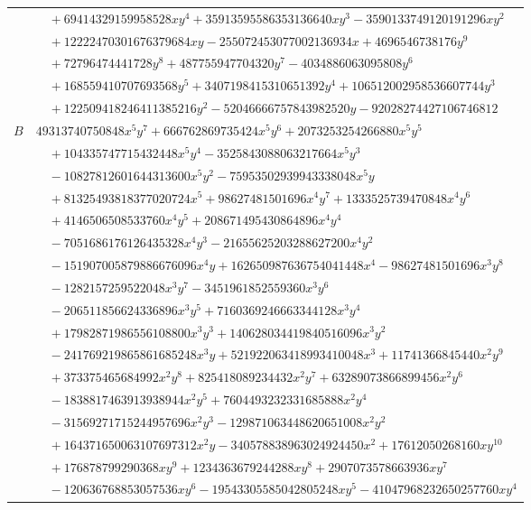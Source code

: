 \documentclass[11pt]{article}
\begin{document}
\begin{longtable}{@{}ll@{}}
 & $\quad +69414329159958528xy^{4}+35913595586353136640xy^{3}-3590133749120191296xy^{2}$\\
 & $\quad +12222470301676379684xy-255072453077002136934x+4696546738176y^{9}$\\
 & $\quad +72796474441728y^{8}+487755947704320y^{7}-4034886063095808y^{6}$\\
 & $\quad +168559410707693568y^{5}+3407198415310651392y^{4}+106512002958536607744y^{3}$\\
 & $\quad +122509418246411385216y^{2}-52046666757843982520y-92028274427106746812$\\
$B$ & $49313740750848x^{5}y^{7}+666762869735424x^{5}y^{6}+2073253254266880x^{5}y^{5}$\\
 & $\quad +104335747715432448x^{5}y^{4}-3525843088063217664x^{5}y^{3}$\\
 & $\quad -10827812601644313600x^{5}y^{2}-75953502939943338048x^{5}y$\\
 & $\quad +81325493818377020724x^{5}+98627481501696x^{4}y^{7}+1333525739470848x^{4}y^{6}$\\
 & $\quad +4146506508533760x^{4}y^{5}+208671495430864896x^{4}y^{4}$\\
 & $\quad -7051686176126435328x^{4}y^{3}-21655625203288627200x^{4}y^{2}$\\
 & $\quad -151907005879886676096x^{4}y+162650987636754041448x^{4}-98627481501696x^{3}y^{8}$\\
 & $\quad -1282157259522048x^{3}y^{7}-3451961852559360x^{3}y^{6}$\\
 & $\quad -206511856624336896x^{3}y^{5}+7160369246663344128x^{3}y^{4}$\\
 & $\quad +17982871986556108800x^{3}y^{3}+140628034419840516096x^{3}y^{2}$\\
 & $\quad -241769219865861685248x^{3}y+521922063418993410048x^{3}+11741366845440x^{2}y^{9}$\\
 & $\quad +373375465684992x^{2}y^{8}+825418089234432x^{2}y^{7}+63289073866899456x^{2}y^{6}$\\
 & $\quad -1838817463913938944x^{2}y^{5}+7604493232331685888x^{2}y^{4}$\\
 & $\quad -31569271715244957696x^{2}y^{3}-129871063448620651008x^{2}y^{2}$\\
 & $\quad +164371650063107697312x^{2}y-340578838963024924450x^{2}+17612050268160xy^{10}$\\
 & $\quad +176878799290368xy^{9}+1234363679244288xy^{8}+2907073578663936xy^{7}$\\
 & $\quad -120636768853057536xy^{6}-19543305585042805248xy^{5}-41047968232650257760xy^{4}$\\

\end{longtable}
\end{document}
